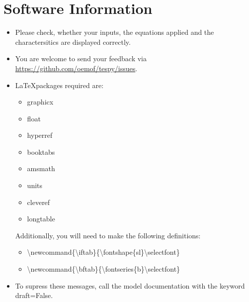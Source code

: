 \section*{Software Information}

\begin{itemize}
\item Please check, whether your inputs, the equations applied and the charactersitics are displayed correctly.
\item You are welcome to send your feedback via \url{https://github.com/oemof/tespy/issues}.
\item \LaTeX packages required are:
\begin{itemize}
\item graphicx
\item float
\item hyperref
\item booktabs
\item amsmath
\item units
\item cleveref
\item longtable
\end{itemize}
Additionally, you will need to make the following definitions:
\begin{itemize}
\item \textbackslash newcommand\{\textbackslash iftab\}\{\textbackslash fontshape\{sl\}\textbackslash selectfont\}
\item \textbackslash newcommand\{\textbackslash bftab\}\{\textbackslash fontseries\{b\}\textbackslash selectfont\}
\end{itemize}
\item To supress these messages, call the model documentation with the keyword draft=False.
\end{itemize}

